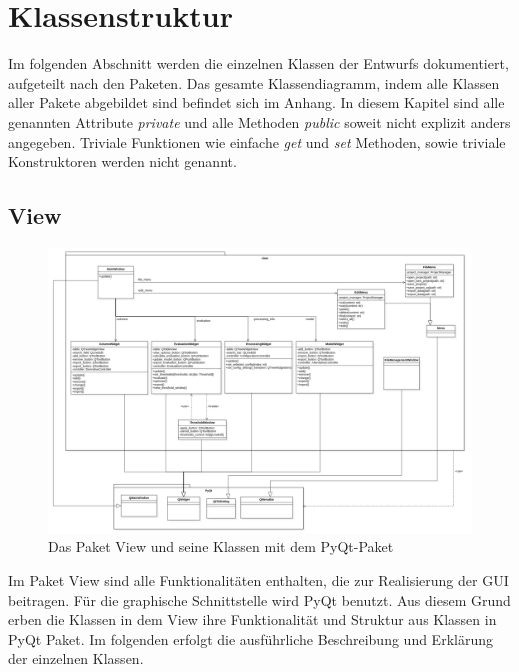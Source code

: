 \documentclass{article}
\begin{document}
\newpage
\section{Klassenstruktur}
Im folgenden Abschnitt werden die einzelnen Klassen der Entwurfs dokumentiert, aufgeteilt nach den Paketen. Das gesamte Klassendiagramm, indem alle Klassen aller Pakete abgebildet sind befindet sich im Anhang. In diesem Kapitel sind alle genannten Attribute \emph{private} und alle Methoden \emph{public} soweit nicht explizit anders angegeben. Triviale Funktionen wie einfache \emph{get} und \emph{set} Methoden, sowie triviale Konstruktoren werden nicht genannt.

\subsection{View}
\begin{figure}[H]%
    \centering
    \includegraphics[width=15cm]{entwurf/Entwurf_dokument/img/Alissa/ViewUpdated.png}
    \caption{Das Paket View und seine Klassen mit dem PyQt-Paket}
\end{figure}
Im Paket View sind alle Funktionalitäten enthalten, die zur Realisierung der GUI beitragen. Für die graphische Schnittstelle wird PyQt benutzt. Aus diesem Grund erben die Klassen in dem View ihre Funktionalität und Struktur aus Klassen in PyQt Paket. Im folgenden erfolgt die ausführliche Beschreibung und Erklärung der einzelnen Klassen.
\end{document}
